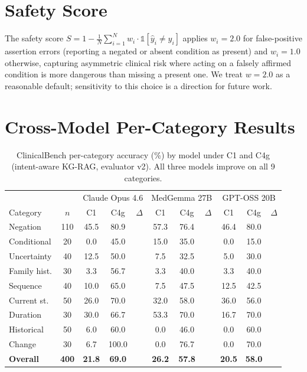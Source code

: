 \section{Safety Score}
\label{app:safety}

The safety score $S = 1 - \frac{1}{N} \sum_{i=1}^{N} w_i \cdot \mathbb{1}[\hat{y}_i \neq y_i]$ applies $w_i = 2.0$ for false-positive assertion errors (reporting a negated or absent condition as present) and $w_i = 1.0$ otherwise, capturing asymmetric clinical risk where acting on a falsely affirmed condition is more dangerous than missing a present one.
We treat $w=2.0$ as a reasonable default; sensitivity to this choice is a direction for future work.


\section{Cross-Model Per-Category Results}
\label{app:crossmodel_categories}

\begin{table}[ht]
\centering
\caption{ClinicalBench per-category accuracy (\%) by model under C1 and C4g (intent-aware KG-RAG, evaluator v2). All three models improve on all 9 categories.}
\label{tab:crossmodel_categories}
\small
\begin{tabular}{@{}lcccccccccc@{}}
\toprule
& & \multicolumn{3}{c}{Claude Opus 4.6} & \multicolumn{3}{c}{MedGemma 27B} & \multicolumn{3}{c}{GPT-OSS 20B} \\
\cmidrule(lr){3-5} \cmidrule(lr){6-8} \cmidrule(lr){9-11}
Category & $n$ & C1 & C4g & $\Delta$ & C1 & C4g & $\Delta$ & C1 & C4g & $\Delta$ \\
\midrule
Negation & 110 & 45.5 & 80.9 & \up{35.5} & 57.3 & 76.4 & \up{19.1} & 46.4 & 80.0 & \up{33.6} \\
Conditional & 20 & 0.0 & 45.0 & \up{45.0} & 15.0 & 35.0 & \up{20.0} & 0.0 & 15.0 & \up{15.0} \\
Uncertainty & 40 & 12.5 & 50.0 & \up{37.5} & 7.5 & 32.5 & \up{25.0} & 5.0 & 30.0 & \up{25.0} \\
Family hist. & 30 & 3.3 & 56.7 & \up{53.3} & 3.3 & 40.0 & \up{36.7} & 3.3 & 40.0 & \up{36.7} \\
Sequence & 40 & 10.0 & 65.0 & \up{55.0} & 7.5 & 47.5 & \up{40.0} & 12.5 & 42.5 & \up{30.0} \\
Current st. & 50 & 26.0 & 70.0 & \up{44.0} & 32.0 & 58.0 & \up{26.0} & 36.0 & 56.0 & \up{20.0} \\
Duration & 30 & 30.0 & 66.7 & \up{36.7} & 53.3 & 70.0 & \up{16.7} & 16.7 & 70.0 & \up{53.3} \\
Historical & 50 & 6.0 & 60.0 & \up{54.0} & 0.0 & 46.0 & \up{46.0} & 0.0 & 60.0 & \up{60.0} \\
Change & 30 & 6.7 & 100.0 & \up{93.3} & 0.0 & 76.7 & \up{76.7} & 0.0 & 70.0 & \up{70.0} \\
\midrule
\textbf{Overall} & \textbf{400} & \textbf{21.8} & \textbf{69.0} & \up{\textbf{47.2}} & \textbf{26.2} & \textbf{57.8} & \up{\textbf{31.5}} & \textbf{20.5} & \textbf{58.0} & \up{\textbf{37.5}} \\
\bottomrule
\end{tabular}
\end{table}


